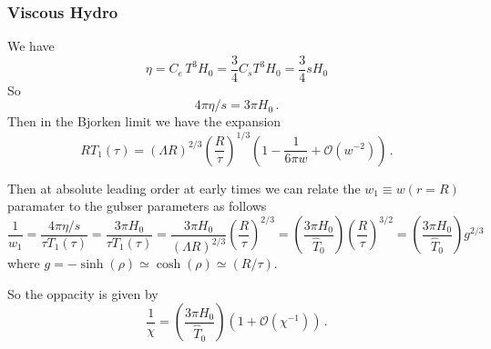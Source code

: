 \documentclass[12pt,aps,preprint,nofootinbib,noshowkeys,noshowpacs,longbibliography,superscriptaddress,tightenlines]{revtex4-2}
\begin{document}
\subsubsection{Viscous  Hydro}

We have
\begin{equation}
  \eta = C_e \, T^3 H_0 = \frac{3}{4} C_sT^3 H_0  = \frac{3}{4} s H_0
\end{equation}
So
\begin{equation}
4\pi \eta/s = 3 \pi H_0 \, .
\end{equation}
Then in the Bjorken limit we have the expansion
\begin{equation}
   R T_1 (\tau)= (\Lambda R)^{2/3} \left( \frac{R}{\tau} \right)^{1/3} \left( 1 - \frac{1}{6\pi w} + \mathcal O(w^{-2}) \right) \, .
\end{equation}

Then at absolute leading order at early times we can relate the $w_1 \equiv w(r=R)$ paramater to the gubser parameters as follows 
\begin{equation}
  \frac{1}{w_1} = \frac{4\pi \eta/s}{\tau T_1(\tau)} = \frac{3\pi H_0}{\tau T_1(\tau)} = \frac{3\pi H_0}{(\Lambda R)^{2/3}}  \left(\frac{R}{\tau} \right)^{2/3} 
  = \left(\frac{3\pi H_0}{\hat{T}_0} \right) \left(\frac{R}{\tau}\right)^{3/2} = \left( \frac{3\pi H_0}{{\hat T}_0} \right) g^{2/3} 
\end{equation}
where $g = -\sinh(\rho) \simeq \cosh(\rho) \simeq (R/\tau)$.

So the oppacity is given by 
\begin{equation}
\frac{1}{\chi} = \left(\frac{3\pi H_0}{\hat T_0} \right)  \left(1 + \mathcal O(\chi^{-1}) \right) \, .
\end{equation}
\end{document}
